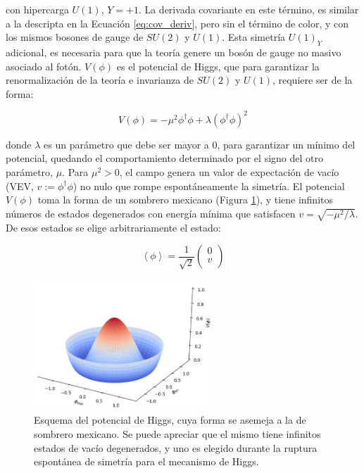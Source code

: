 \noindent
con hipercarga $U(1)$, $Y=+1$. La derivada covariante en este término, es similar a la descripta en la Ecuación \ref{eq:cov_deriv}, pero sin el término de color, y con los mismos bosones de gauge de $SU(2)$ y $U(1)$. Esta simetría $U(1)_Y$ adicional, es necesaria para que la teoría genere un bosón de gauge no masivo asociado al fotón.
$V(\phi)$ es el potencial de Higgs, que para garantizar la renormalización de la teoría e invarianza de $SU(2)$ y $U(1)$, requiere ser de la forma:

\begin{equation}
	V(\phi) = - \mu^{2}\phi^{\dagger}\phi + \lambda(\phi^{\dagger}\phi)^{2}
	\label{eq:higgs_pot}
\end{equation}

\noindent
donde $\lambda$ es un parámetro que debe ser mayor a $0$, para garantizar un mínimo del potencial, quedando el comportamiento determinado por el signo del otro parámetro, $\mu$. Para $\mu^2>0$, el campo genera un valor de expectación de vacío (VEV, $v:=\phi^{\dagger}\phi$) no nulo que rompe espontáneamente la simetría. El potencial $V(\phi)$ toma la forma de un sombrero mexicano (Figura \ref{fig:mexican_hat}), y tiene infinitos números de estados degenerados con energía mínima que satisfacen $v = \sqrt{-\mu^2/\lambda}$. De esos estados se elige arbitrariamente el estado:

\begin{equation}
	\left<\phi\right> = \frac{1}{\sqrt{2}}
	\begin{pmatrix}
	0 \\
	v \\
	\end{pmatrix}
\end{equation}

\begin{figure}
  \centering
  \includegraphics[width=0.6\textwidth]{images/theory/mexican_hat.png}
  \caption{Esquema del potencial de Higgs, cuya forma se asemeja a la de sombrero mexicano. Se puede apreciar que el mismo tiene infinitos estados de vacío degenerados, y uno es elegido durante la ruptura espontánea de simetría para el mecanismo de Higgs.}
  \label{fig:mexican_hat}
\end{figure}

